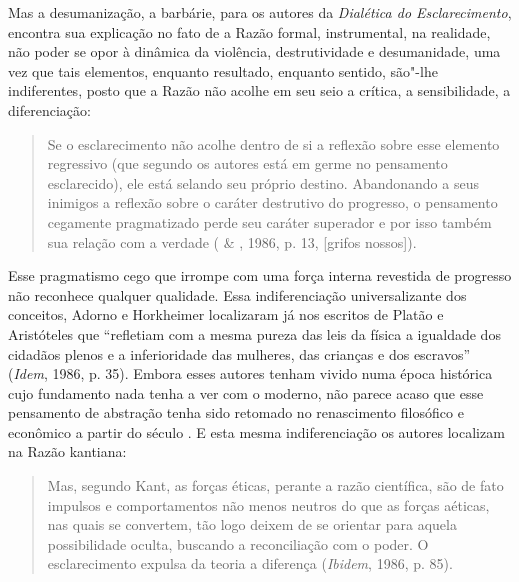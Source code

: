 Mas a desumanização, a barbárie, para os autores da \emph{Dialética do
Esclarecimento}, encontra sua explicação no fato de a Razão formal,
instrumental, na realidade, não poder se opor à dinâmica da violência,
destrutividade e desumanidade, uma vez que tais elementos, enquanto
resultado, enquanto sentido, são"-lhe indiferentes, posto que a Razão não
acolhe em seu seio a crítica, a sensibilidade, a diferenciação:

\begin{quote}
Se o esclarecimento não acolhe dentro de si a reflexão sobre esse
elemento regressivo (que segundo os autores está em germe no pensamento
esclarecido), ele está selando seu próprio destino.
Abandonando a seus inimigos a reflexão sobre o caráter destrutivo do
progresso, o pensamento cegamente pragmatizado perde seu caráter
superador e por isso também sua relação com a verdade ( \& , 1986, p. 13, [grifos nossos]).
\end{quote}

Esse pragmatismo cego que irrompe com uma força interna revestida de
progresso não reconhece qualquer qualidade. Essa indiferenciação
universalizante dos conceitos, Adorno e Horkheimer localizaram já nos
escritos de Platão e Aristóteles que ``refletiam com a mesma pureza das
leis da física a igualdade dos cidadãos plenos e a inferioridade das
mulheres, das crianças e dos escravos'' (\emph{Idem}, 1986, p. 35).
Embora esses autores tenham vivido numa época histórica cujo fundamento
nada tenha a ver com o moderno, não parece acaso que esse pensamento de
abstração tenha sido retomado no renascimento filosófico e econômico a
partir do século . E esta mesma indiferenciação os autores localizam
na Razão kantiana:

\begin{quote}
Mas, segundo Kant, as forças éticas, perante a razão científica, são de
fato impulsos e comportamentos não menos neutros do que as forças
aéticas, nas quais se convertem, tão logo deixem de se orientar para
aquela possibilidade oculta, buscando a reconciliação com o poder. O
esclarecimento expulsa da teoria a diferença (\emph{Ibidem}, 1986, p.
85).
\end{quote}

